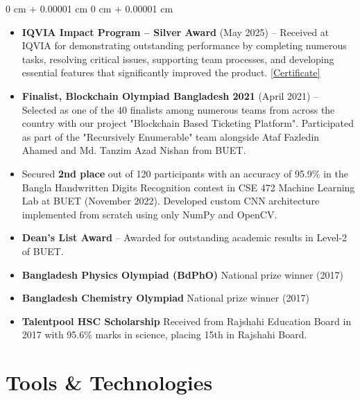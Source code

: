 \documentclass[10pt, letterpaper]{article}
\newenvironment{onecolentry}{
    \begin{adjustwidth}{
        0 cm + 0.00001 cm
    }{
        0 cm + 0.00001 cm
    }
}{
    \end{adjustwidth}
} %
\begin{document}
        \begin{onecolentry}
            \begin{itemize}
                \item \textbf{IQVIA Impact Program – Silver Award} (May 2025) -- Received at IQVIA for demonstrating outstanding performance by completing numerous tasks, resolving critical issues, supporting team processes, and developing essential features that significantly improved the product. \href{https://drive.google.com/file/d/1Vc4E2RoQEPmbfS56oLdUih-oJDBok9sP/view?usp=share_link}{[Certificate]}
                \item \textbf{Finalist, Blockchain Olympiad Bangladesh 2021} (April 2021) -- Selected as one of the 40 finalists among numerous teams from across the country with our project "Blockchain Based Ticketing Platform". Participated as part of the "Recursively Enumerable" team alongside Ataf Fazledin Ahamed and Md. Tanzim Azad Nishan from BUET.
                \item Secured \textbf{2nd place} out of 120 participants with an accuracy of 95.9\% in the Bangla Handwritten Digits Recognition contest in CSE 472 Machine Learning Lab at BUET (November 2022). Developed custom CNN architecture implemented from scratch using only NumPy and OpenCV.
                \item \textbf{Dean's List Award} -- Awarded for outstanding academic results in Level-2 of BUET.
                \item \textbf{Bangladesh Physics Olympiad (BdPhO)} National prize winner (2017)
                \item \textbf{Bangladesh Chemistry Olympiad} National prize winner (2017)
                \item \textbf{Talentpool HSC Scholarship} Received from Rajshahi Education Board in 2017 with 95.6\% marks in science, placing 15th in Rajshahi Board.
            \end{itemize}
            
        \end{onecolentry}

         \section{Tools \& Technologies}
\end{document}
